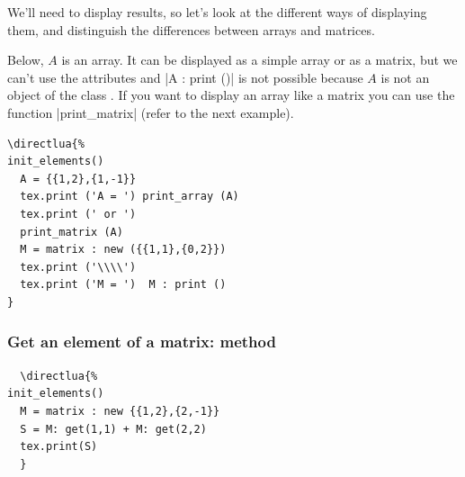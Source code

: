We'll need to display results, so let's look at the different ways of displaying them, and distinguish the differences between arrays and matrices.

Below, $A$ is an array. It can be displayed as a simple array or as a matrix, but we can't use the attributes and |A : print ()| is not possible because $A$ is not an object of the class . If you want to display an array like a matrix you can use the function |print_matrix| (refer to the next example).

\vspace{.5em}
\begin{minipage}{.5\textwidth}
\begin{Verbatim}
\directlua{%
init_elements()
  A = {{1,2},{1,-1}}
  tex.print ('A = ') print_array (A)
  tex.print (' or ')
  print_matrix (A)
  M = matrix : new ({{1,1},{0,2}})
  tex.print ('\\\\')
  tex.print ('M = ')  M : print ()
}
\end{Verbatim}
\end{minipage}
 \begin{minipage}{.5\textwidth}
 \end{minipage}



\subsubsection{Get an element of a matrix: method  } %
\label{ssub:get_an_element_of_a_matrix}

\begin{minipage}{.5\textwidth}
\begin{Verbatim}
  \directlua{%
init_elements()
  M = matrix : new {{1,2},{2,-1}}
  S = M: get(1,1) + M: get(2,2)
  tex.print(S)
  }
\end{Verbatim}
\end{minipage}
\begin{minipage}{.5\textwidth}
\end{minipage}


